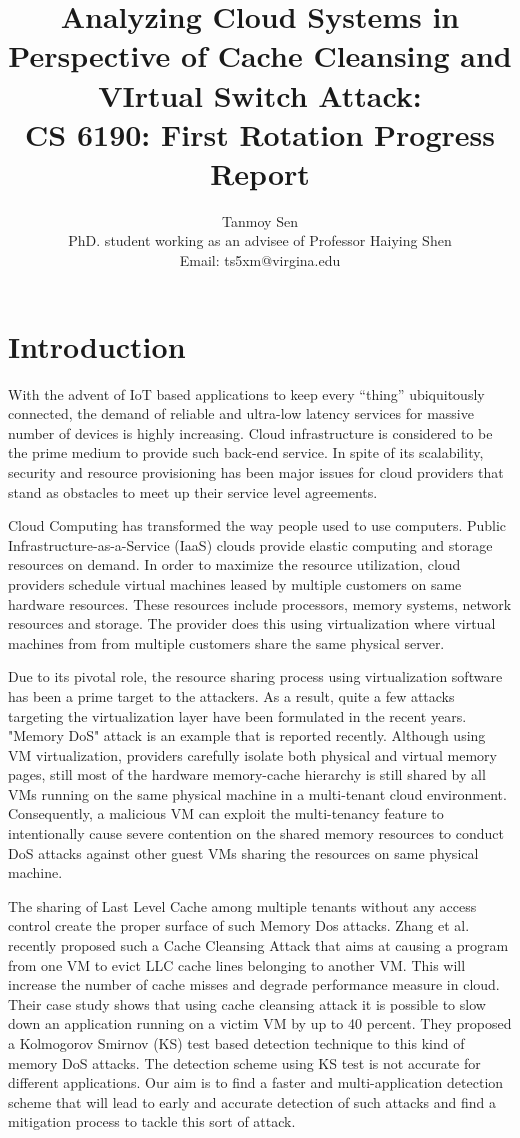 \documentclass[a4paper,10pt]{article}
\title{Analyzing Cloud Systems in Perspective of Cache Cleansing and VIrtual Switch Attack:\\
CS 6190: First Rotation Progress Report}
\author{Tanmoy Sen \\ PhD. student working as an advisee of Professor Haiying Shen\\
Email: ts5xm@virgina.edu}
\begin{document}
\maketitle

\section{Introduction}
With the advent of IoT based applications to keep every “thing” ubiquitously connected, the demand of reliable and ultra-low latency services for massive number of devices is highly increasing. Cloud infrastructure is considered to be the prime medium to provide such back-end service. In spite of its scalability, security and resource provisioning has been major issues for cloud providers that stand as obstacles to meet up their service level agreements. 

Cloud Computing has transformed the way people used to use computers. Public Infrastructure-as-a-Service (IaaS) clouds provide elastic computing and storage resources on demand. In order to maximize the resource utilization, cloud providers schedule virtual machines leased by multiple customers on same hardware resources. These resources include processors, memory systems, network resources and storage. The provider does this using virtualization where virtual machines from from multiple customers share the same physical server.

Due to its pivotal role, the resource sharing process using virtualization software  has been a prime target to the attackers. As a result, quite a few attacks targeting the virtualization layer have been formulated in the recent years. "Memory DoS" attack is an example that is reported recently. Although using VM virtualization, providers carefully isolate both physical and virtual memory pages, still most of the hardware memory-cache hierarchy is still shared by all VMs running on the same physical machine in a multi-tenant cloud environment. Consequently, a malicious VM can exploit the multi-tenancy feature to intentionally cause severe contention on the shared memory resources to conduct DoS attacks against other guest VMs sharing the resources on same physical machine.

The sharing of Last Level Cache among multiple tenants without any access control create the proper surface of such Memory Dos attacks. Zhang et al. \cite{cacheCleansing} recently proposed such a Cache Cleansing Attack that aims at causing a program from one VM to evict LLC cache lines belonging to another VM. This will increase the number of cache misses and degrade performance measure in cloud. Their case study shows that using cache cleansing attack it is possible to slow down an application running on a victim VM by up to 40 percent. They proposed a Kolmogorov Smirnov (KS) test based detection technique to this kind of memory DoS attacks. The detection scheme using KS test is not accurate for different applications. Our aim is to find a faster and multi-application detection scheme that will lead to early and accurate detection of such attacks and find a mitigation process to tackle this sort of attack.
\end{document}
